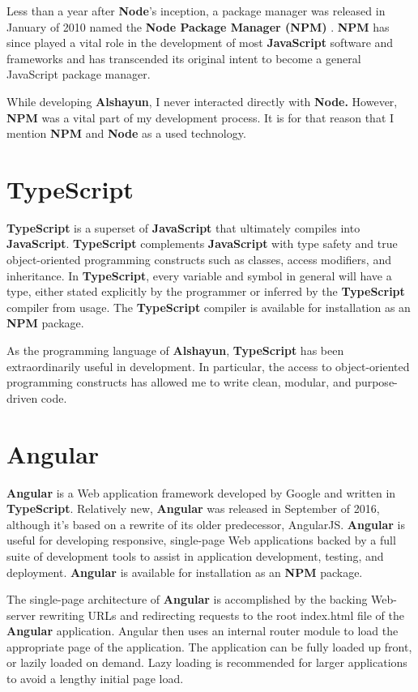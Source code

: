 \documentclass[12pt]{report}
\begin{document}
Less than a year after \textbf{Node}'s inception, a package manager was released
in January of 2010 named the \textbf{Node Package Manager (NPM)} \cite{npm}.
\textbf{NPM} has since played a vital role in the development of most
\textbf{JavaScript} software and frameworks and has transcended its original
intent to become a general JavaScript package manager.

While developing \textbf{Alshayun}, I never interacted directly with
\textbf{Node.} However, \textbf{NPM} was a vital part of my development process.
It is for that reason that I mention \textbf{NPM} and \textbf{Node} as a used
technology.

    \section{TypeScript}

\textbf{TypeScript} \cite{typescript} is a superset of \textbf{JavaScript} that
ultimately compiles into \textbf{JavaScript}. \textbf{TypeScript} complements
\textbf{JavaScript} with type safety and true object-oriented programming
constructs such as classes, access modifiers, and inheritance. In
\textbf{TypeScript}, every variable and symbol in general will have a type,
either stated explicitly by the programmer or inferred by the
\textbf{TypeScript} compiler from usage. The \textbf{TypeScript} compiler is
available for installation as an \textbf{NPM} package.

As the programming language of \textbf{Alshayun}, \textbf{TypeScript} has been
extraordinarily useful in development. In particular, the access to
object-oriented programming constructs has allowed me to write clean, modular,
and purpose-driven code.

    \section{Angular}

\textbf{Angular} \cite{angular} is a Web application framework developed by
Google and written in \textbf{TypeScript}.  Relatively new, \textbf{Angular} was
released in September of 2016, although it's based on a rewrite of its older
predecessor, AngularJS. \textbf{Angular} is useful for developing responsive,
single-page Web applications backed by a full suite of development tools to
assist in application development, testing, and deployment. \textbf{Angular} is
available for installation as an \textbf{NPM} package.

The single-page architecture of \textbf{Angular} is accomplished by the backing
Web-server rewriting URLs and redirecting requests to the root index\@.html file
of the \textbf{Angular} application. Angular then uses an internal router module
to load the appropriate page of the application. The application can be fully
loaded up front, or lazily loaded on demand. Lazy loading is recommended for
larger applications to avoid a lengthy initial page load.
\end{document}
